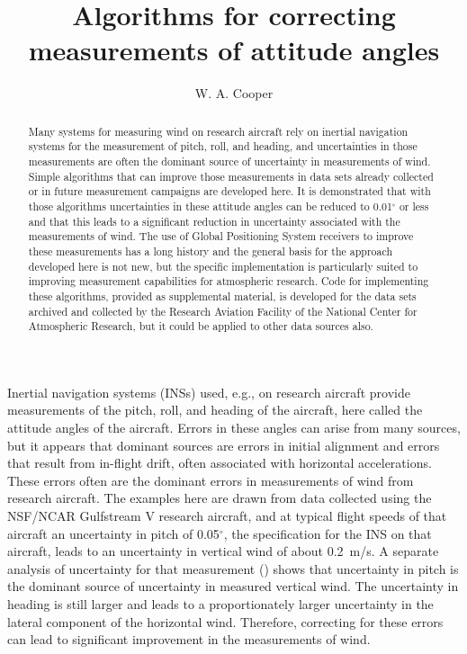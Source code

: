 \documentclass[english,british,amtd,bookmarks=false,unicode=true]{copernicus}\usepackage[]{graphicx}\usepackage[]{color}
\begin{document}
\title{Algorithms for correcting measurements of attitude angles}


\author{W. A. Cooper}








\maketitle
\begin{abstract}
Many systems for measuring wind on research aircraft rely on inertial
navigation systems for the measurement of pitch, roll, and heading,
and uncertainties in those measurements are often the dominant source
of uncertainty in measurements of wind. Simple algorithms that can
improve those measurements in data sets already collected or in future
measurement campaigns are developed here. It is demonstrated that
with those algorithms uncertainties in these attitude angles can be
reduced to 0.01$^{\circ}$ or less and that this leads to a significant
reduction in uncertainty associated with the measurements of wind.
The use of Global Positioning System receivers to improve these measurements
has a long history and the general basis for the approach developed
here is not new, but the specific implementation is particularly suited
to improving measurement capabilities for atmospheric research. Code
for implementing these algorithms, provided as supplemental material,
is developed for the data sets archived and collected by the Research
Aviation Facility of the National Center for Atmospheric Research,
but it could be applied to other data sources also.
\end{abstract}

\introduction{}

Inertial navigation systems (INSs) used, e.g., on research aircraft
provide measurements of the pitch, roll, and heading of the aircraft,
here called the attitude angles of the aircraft. Errors in these angles
can arise from many sources, but it appears that dominant sources
are errors in initial alignment and errors that result from in-flight
drift, often associated with horizontal accelerations. These errors
often are the dominant errors in measurements of wind from research
aircraft. The examples here are drawn from data collected using the
NSF/NCAR Gulfstream V research aircraft, and at typical flight speeds
of that aircraft an uncertainty in pitch of 0.05$^{\circ}$, the specification
for the INS on that aircraft, leads to an uncertainty in vertical
wind of about 0.2~m/s. A separate analysis of uncertainty for that
measurement (\citet{Cooper2016ncartn}) shows that uncertainty in
pitch is the dominant source of uncertainty in measured vertical wind.
The uncertainty in heading is still larger and leads to a proportionately
larger uncertainty in the lateral component of the horizontal wind.
Therefore, correcting for these errors can lead to significant improvement
in the measurements of wind.
\end{document}
